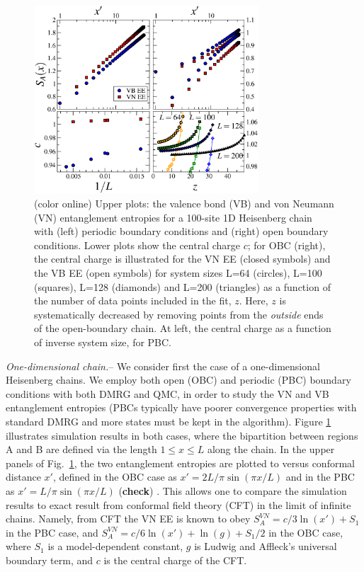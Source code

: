 \documentclass[prl,aps,twocolumn,floatfix,amsmath,amssymb,superscriptaddress,tightenlines]{revtex4}
\begin{document}
\begin{figure} {
\includegraphics[width=3.3in]{4-panelFIG1.eps} \caption{(color online)
Upper plots: the valence bond (VB) and von Neumann (VN) entanglement
entropies for a 100-site 1D Heisenberg chain with (left) periodic boundary
conditions and (right) open boundary conditions.  Lower plots show the
central charge $c$; for OBC (right), the central charge is illustrated for
the VN EE (closed symbols) and the VB EE (open symbols) for system sizes
L=64 (circles), L=100 (squares), L=128 (diamonds) and L=200 (triangles) as
a function of the number of data points included in the fit, $z$.  Here,
$z$ is systematically decreased by removing points from the {\it outside}
ends of the open-boundary chain.  At left, the central charge as a
function of inverse system size, for PBC.  \label{1D}}} \end{figure}

{\it One-dimensional chain.}-- We consider first the case of a
one-dimensional Heisenberg chains.  We employ both open (OBC) and periodic
(PBC) boundary conditions with both DMRG and QMC, in order to study the VN
and VB entanglement entropies (PBCs typically have poorer convergence
properties with standard DMRG and more states must be kept in the
algorithm).  Figure \ref{1D} illustrates simulation results in both cases,
where the bipartition between regions A and B are defined via the length
$1 \leq x \leq L$ along the chain.  In the upper panels of Fig.~\ref{1D},
the two entanglement entropies are plotted to versus conformal distance
$x'$, defined in the OBC case as $x'=2L/\pi \sin(\pi x / L)$ and in the
PBC as $x'=L/\pi \sin(\pi x / L)$ ({\bf check}) \cite{Cardy}.  This allows
one to compare the simulation results to exact result from conformal field
theory (CFT) in the limit of infinite chains.  Namely, from CFT the VN EE
is known to obey $S^{VN}_A = c/3 \ln(x') + S_1$ in the PBC case, and
$S^{VN}_A = c/6 \ln(x') + \ln(g)+S_1/2$ in the OBC case, where $S_1$ is a
model-dependent constant, $g$ is Ludwig and Affleck's universal boundary
term, and $c$ is the central charge of the CFT.
\end{document}
